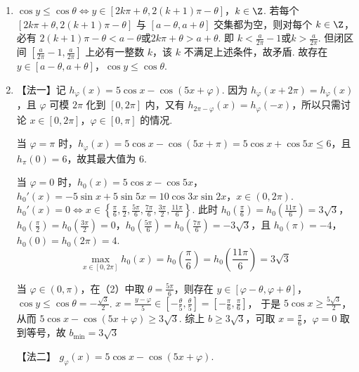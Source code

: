 \begin{solution}
\begin{enumerate}
\item \(\cos y \le \cos\theta \iff y\in [2k\pi+\theta,2(k+1)\pi-\theta]\)，\(k\in\Z\). 若每个 \([2k\pi+\theta,2(k+1)\pi-\theta]\) 与 \([a-\theta,a+\theta]\) 交集都为空，则对每个 \(k\in\Z\)，必有 \(2(k+1)\pi - \theta < a-\theta\)或\(2k\pi + \theta > a+\theta\). 即 \(k < \frac{a}{2\pi} - 1\)或\(k > \frac{a}{2\pi}\). 但闭区间 \(\left[\frac{a}{2\pi}-1,\frac{a}{2\pi}\right]\) 上必有一整数 \(k\)，该 \(k\) 不满足上述条件，故矛盾. 故存在 \(y\in[a-\theta,a+\theta]\)，\(\cos y\le \cos\theta\).

\item 【法一】记 \(h_\varphi(x)=5\cos x-\cos (5x+\varphi)\). 因为 \(h_\varphi(x+2\pi)=h_\varphi(x)\)，且 \(\varphi\) 可模 \(2\pi\) 化到 \([0,2\pi]\) 内，又有 \(h_{2\pi-\varphi}(x)=h_\varphi(-x)\)，所以只需讨论 \(x\in[0,2\pi]\)，\(\varphi\in[0,\pi]\) 的情况.

当 \(\varphi=\pi\) 时，\(h_\varphi(x)=5\cos x-\cos(5x+\pi)=5\cos x+\cos 5x\le 6\)，且 \(h_{\pi}(0)=6\)，故其最大值为 \(6\).

当 \(\varphi=0\) 时，\(h_0(x)=5\cos x-\cos 5x\)，\(h_0'(x)=-5\sin x+5\sin 5x=10\cos 3x\sin 2x\)，\(x\in(0,2\pi)\). \(h_0'(x)=0 \iff x\in\left\{\frac{\pi}{6},\frac{\pi}{2},\frac{5\pi}{6},\frac{7\pi}{6},\frac{3\pi}{2},\frac{11\pi}{6}\right\}\).
此时 \(h_0\!\left(\frac{\pi}{6}\right)=h_0\!\left(\frac{11\pi}{6}\right)=3\sqrt{3}\)，\(h_0\!\left(\frac{\pi}{2}\right)=h_0\!\left(\frac{3\pi}{2}\right)=0\)，\(h_0\!\left(\frac{5\pi}{6}\right)=h_0\!\left(\frac{7\pi}{6}\right)=-3\sqrt{3}\)，且 \(h_0(\pi)=-4\)，\(h_0(0)=h_0(2\pi)=4\).
\[
\max_{x\in[0,2\pi]}h_0(x)=h_0\left(\frac{\pi}{6}\right)=h_0\left(\frac{11\pi}{6}\right)=3\sqrt{3}
\]

当 \(\varphi\in(0,\pi)\)，在（2）中取 \(\theta=\frac{5\pi}{6}\)，则存在
\(y\in[\varphi-\theta,\varphi+\theta]\)，\(\cos y\le \cos\theta=-\frac{\sqrt{3}}{2}\).
\(x=\frac{y-\varphi}{5}\in\left[-\frac{\theta}{5},\frac{\theta}{5}\right]=\left[-\frac{\pi}{6},\frac{\pi}{6}\right]\)，
于是 \(5\cos x\ge \frac{5\sqrt{3}}{2}\)，从而
\(5\cos x-\cos(5x+\varphi)\ge 3\sqrt{3}\).
综上 \(b\ge3\sqrt{3}\)，可取 \(x=\frac{\pi}{6}\)，\(\varphi=0\) 取到等号，故
\(
b_{\min}=3\sqrt{3}
\)

【法二】
\(g_\varphi(x)=5\cos x-\cos (5x+\varphi)\).


\end{enumerate}
\end{solution}
